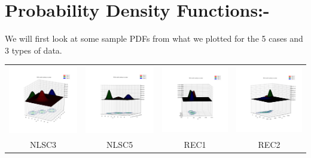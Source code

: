 \documentclass[11pt]{article}
\begin{document}
\section*{Probability Density Functions:-}
We will first look at some sample PDFs from what we plotted for the 5 cases and 3 types of data.
\begin{center}
  \setlength\tabcolsep{-7pt}
  \begin{tabular}{cccc}
  \includegraphics[width=5.5cm]{classifier/PDFs/NLS/case3.png}
  & \includegraphics[width=5.5cm]{classifier/PDFs/NLS/case5.png}
  & \includegraphics[width=5.5cm]{classifier/PDFs/REAL/case1.png}
  & \includegraphics[width=5.5cm]{classifier/PDFs/REAL/case2.png}\\
  NLSC3 & NLSC5 & REC1 & REC2 \\
  \end{tabular}
\end{center}
\end{document}
